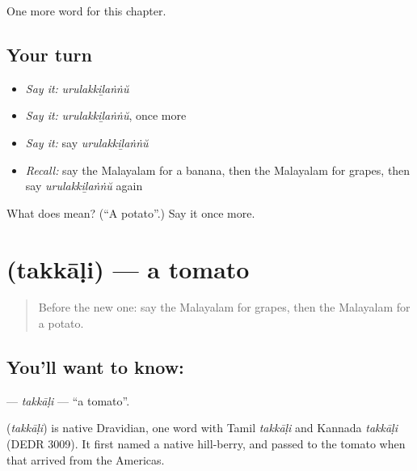 \begin{grammarlens}[title={What you've built}]
One more word for this chapter.
\end{grammarlens}

\subsection*{Your turn}
\begin{itemize}
\raggedright
  \item \emph{Say it:} \emph{urulakkiḻaṅṅŭ}
  \item \emph{Say it:} \emph{urulakkiḻaṅṅŭ}, once more
  \item \emph{Say it:} say \emph{urulakkiḻaṅṅŭ}
  \item \emph{Recall:} say the Malayalam for a banana, then the Malayalam for grapes, then say \emph{urulakkiḻaṅṅŭ} again
\end{itemize}

\begin{tcolorbox}[breakable,colback=teal!4,colframe=teal!35!black,title={Before you move on}]
What does  mean? (\textquotedblleft{}A potato\textquotedblright{}.) Say it once more.
\end{tcolorbox}
\section[\texorpdfstring{\ml{തക്കാളി} (takkāḷi)}{തക്കാളി (takkāḷi)}]{ (takkāḷi) — a tomato}

\label{lesson:ML-C150-takkali}



\begin{quote}
Before the new one: say the Malayalam for grapes, then the Malayalam for a potato.
\end{quote}

\subsection*{You'll want to know: }
\textbf{} — \emph{takkāḷi} — \textquotedblleft{}a tomato\textquotedblright{}.

\begin{cousinweb}
\textbf{} (\emph{takkāḷi}) is native Dravidian, one word with Tamil \emph{takkāḷi} and Kannada \emph{takkāḷi} (DEDR 3009). It first named a native hill-berry, and passed to the tomato when that arrived from the Americas.
\end{cousinweb}

